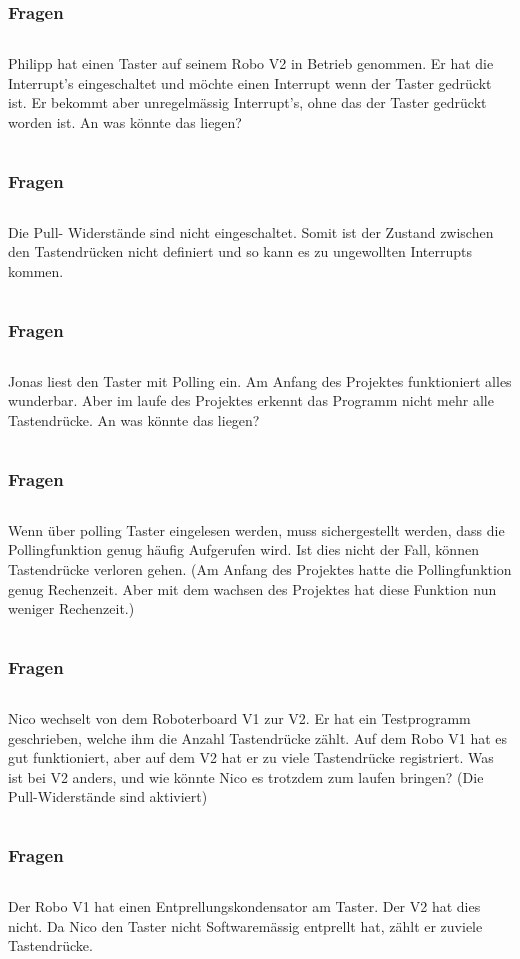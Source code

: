 
\begin{frame}
  \frametitle{Fragen}
	    \begin{column}{1\linewidth}
		Philipp hat einen Taster auf seinem Robo V2 in Betrieb genommen. Er hat die Interrupt’s eingeschaltet und möchte einen Interrupt wenn der Taster gedrückt ist. Er bekommt aber unregelmässig Interrupt's, ohne das der Taster gedrückt worden ist. An was könnte das liegen?
	    \end{column}
\end{frame}

\begin{frame}
	\frametitle{Fragen}
	\begin{column}{1\linewidth}
		Die Pull- Widerstände sind nicht eingeschaltet. Somit ist der Zustand zwischen den Tastendrücken nicht definiert und so kann es zu ungewollten Interrupts kommen. 
	\end{column}
\end{frame}

\begin{frame}
	\frametitle{Fragen}
	\begin{column}{1\linewidth}
		Jonas liest den Taster mit Polling ein. Am Anfang des Projektes funktioniert alles wunderbar. Aber im laufe des Projektes erkennt das Programm nicht mehr alle Tastendrücke. An was könnte das liegen?
	\end{column}
\end{frame}

\begin{frame}
	\frametitle{Fragen}
	\begin{column}{1\linewidth}
		Wenn über polling Taster eingelesen werden, muss sichergestellt werden, dass die Pollingfunktion genug häufig Aufgerufen wird. Ist dies nicht der Fall, können Tastendrücke verloren gehen. (Am Anfang des Projektes hatte die Pollingfunktion genug Rechenzeit. Aber mit dem wachsen des Projektes hat diese Funktion nun weniger Rechenzeit.)
	\end{column}
\end{frame}

\begin{frame}
	\frametitle{Fragen}
	\begin{column}{1\linewidth}
	Nico wechselt von dem Roboterboard V1 zur V2. Er hat ein Testprogramm geschrieben, welche ihm die Anzahl Tastendrücke zählt. Auf dem Robo V1 hat es gut funktioniert, aber auf dem V2 hat er zu viele Tastendrücke registriert. Was ist bei V2 anders, und wie könnte Nico es trotzdem zum laufen bringen? (Die Pull-Widerstände sind aktiviert)
	\end{column}
\end{frame}

\begin{frame}
	\frametitle{Fragen}
	\begin{column}{1\linewidth}
		Der Robo V1 hat einen Entprellungskondensator am Taster. Der V2 hat dies nicht. Da Nico den Taster nicht Softwaremässig entprellt hat, zählt er zuviele Tastendrücke.
	\end{column}
\end{frame}